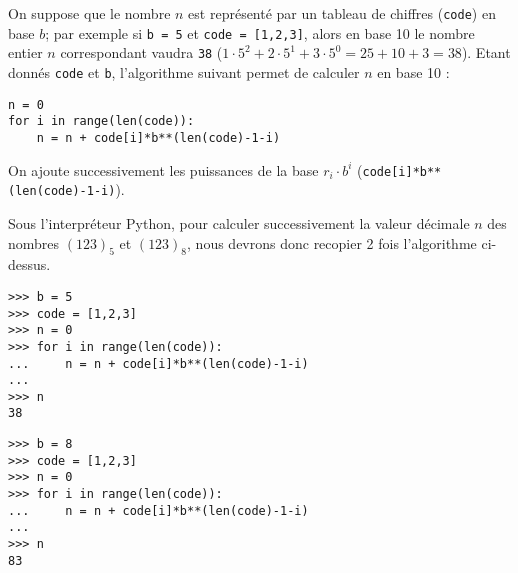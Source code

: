 \noindent On suppose que le nombre $n$ est représenté par un tableau de chiffres ({\tt code}) 
en base $b$; par exemple si {\tt b = 5} et {\tt code = [1,2,3]}, alors en base 10 le nombre
entier $n$ correspondant vaudra {\tt 38} ($1\cdot 5^2 + 2\cdot 5^1 + 3\cdot 5^0 = 25 + 10 + 3 = 38$).
Etant donnés {\tt code} et {\tt b}, l'algorithme suivant permet de calculer $n$ en base 10 :

\begin{py}{7cm}
\begin{verbatim}
n = 0
for i in range(len(code)):
    n = n + code[i]*b**(len(code)-1-i)
\end{verbatim}
\end{py}
\hfill
\begin{py}{7.5cm}
On ajoute successivement les puissances de la base $r_i\cdot b^i$
({\tt code[i]*b**(len(code)-1-i)}).
\end{py}


\noindent Sous l'interpréteur {\sc Python}, pour calculer successivement la valeur
décimale $n$ des nombres $(123)_{5}$ et $(123)_{8}$, nous devrons donc recopier
2 fois l'algorithme ci-dessus.

\begin{py}{7cm}
\begin{verbatim}
>>> b = 5
>>> code = [1,2,3]
>>> n = 0
>>> for i in range(len(code)):
...     n = n + code[i]*b**(len(code)-1-i)
... 
>>> n
38
\end{verbatim}
\end{py}
\hfill
\begin{py}{7.5cm}
\begin{verbatim}
>>> b = 8
>>> code = [1,2,3]
>>> n = 0
>>> for i in range(len(code)):
...     n = n + code[i]*b**(len(code)-1-i)
... 
>>> n
83
\end{verbatim}
\end{py}
\vspace*{2mm}

